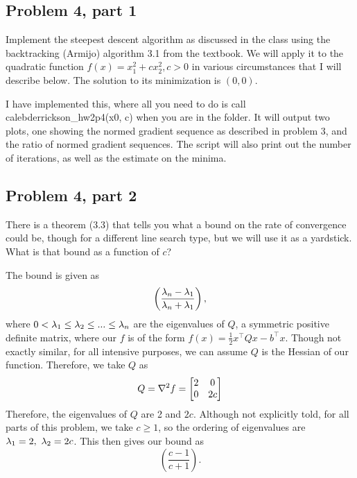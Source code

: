 \subsection{Problem 4, part 1}
Implement the steepest descent algorithm as discussed in the class using the backtracking (Armijo) algorithm 3.1 from the textbook. We will apply it to the quadratic function $f(x) = x_1^2 + cx_2^2, c > 0$ in various circumstances that I will describe below. The solution to its minimization is $(0, 0)$. 
\partbreak
\begin{solution}

    I have implemented this, where all you need to do is call calebderrickson\_hw2p4(x0, c) when you are in the folder. It will output two plots, one showing the normed gradient sequence as described in problem 3, and the ratio of normed gradient sequences. The script will also print out the number of iterations, as well as the estimate on the minima.
\end{solution}

\newpage
\subsection{Problem 4, part 2}
There is a theorem (3.3) that tells you what a bound on the rate of convergence could be, though for a different line search type, but we will use it as a yardstick. What is that bound as a function of $c$?
\partbreak
\begin{solution}

    The bound is given as 
    \[\left ( \frac{\lambda_n - \lambda_1}{\lambda_n + \lambda_1}\right ),\]
    where $0 < \lambda_1 \leq \lambda_2 \leq ... \leq \lambda_n$ are the eigenvalues of $Q$, a symmetric positive definite matrix, where our $f$ is of the form $f(x) = \frac{1}{2}x^\intercal Qx - b^\intercal x$. Though not exactly similar, for all intensive purposes, we can assume $Q$ is the Hessian of our function. Therefore, we take $Q$ as
    \[Q = \grad ^2 f = \mqty[2&0\\0&2c]\]
    Therefore, the eigenvalues of $Q$ are 2 and $2c$. Although not explicitly told, for all parts of this problem, we take $c \geq 1$, so the ordering of eigenvalues are $\lambda_1 = 2, \ \lambda_2 = 2c$. This then gives our bound as 
    \[\left ( \frac{c - 1}{c + 1}\right ).\]

\end{solution}

\newpage
